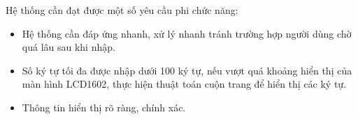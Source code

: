 Hệ thống cần đạt được một số yêu cầu phi chức năng:

\begin{itemize}
	\item Hệ thống cần đáp ứng nhanh, xử lý nhanh tránh trường hợp người dùng chờ quá lâu sau khi nhập.
	\item Số ký tự tối đa được nhập dưới 100 ký tự, nếu vượt quá khoảng hiển thị của màn hình LCD1602, thực hiện thuật toán cuộn trang để hiển thị các ký tự.
	\item Thông tin hiển thị rõ ràng, chính xác.
\end{itemize}